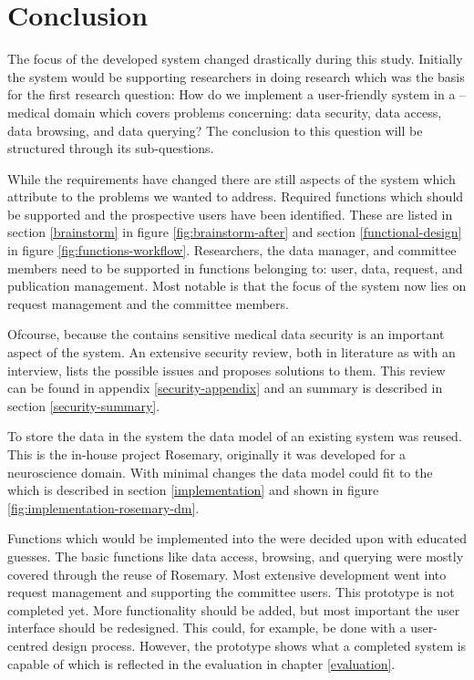 \section{Conclusion}

The focus of the developed system changed drastically during this study.
Initially the system would be supporting researchers in doing research which was the basis for the first research question:
How do we implement a user-friendly system in a \IVF{}--\PRN{} medical domain which covers problems concerning: data security, data access, data browsing, and data querying?
The conclusion to this question will be structured through its sub-questions.

While the requirements have changed there are still aspects of the system which attribute to the problems we wanted to address.
Required functions which should be supported and the prospective users have been identified.
These are listed in section \ref{brainstorm} in figure \ref{fig:brainstorm-after} and section \ref{functional-design} in figure \ref{fig:functions-workflow}.
Researchers, the data manager, and committee members need to be supported in functions belonging to: user, data, request, and publication management.
Most notable is that the focus of the system now lies on request management and the committee members.

Ofcourse, because the \projectdata{} contains sensitive medical data security is an important aspect of the system.
An extensive security review, both in literature as with an interview, lists the possible issues and proposes solutions to them.
This review can be found in appendix \ref{security-appendix} and an summary is described in section \ref{security-summary}.

To store the data in the system the data model of an existing system was reused.
This is the in-house project Rosemary, originally it was developed for a neuroscience domain.
With minimal changes the data model could fit to the \projectdata{} which is described in section \ref{implementation} and shown in figure \ref{fig:implementation-rosemary-dm}.

Functions which would be implemented into the \ivfprototype{} were decided upon with educated guesses.
The basic functions like data access, browsing, and querying were mostly covered through the reuse of Rosemary.
Most extensive development went into request management and supporting the committee users.
This prototype is not completed yet.
More functionality should be added, but most important the user interface should be redesigned.
This could, for example, be done with a user-centred design process.
However, the prototype shows what a completed system is capable of which is reflected in the evaluation in chapter \ref{evaluation}.

